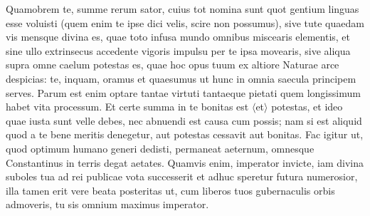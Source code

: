 Quamobrem te, summe rerum sator, cuius tot nomina sunt quot gentium linguas esse voluisti (quem enim te ipse dici velis, scire non possumus), sive tute quaedam vis mensque divina es, quae toto infusa mundo omnibus miscearis elementis, et sine ullo extrinsecus accedente vigoris impulsu per te ipsa movearis, sive aliqua supra omne caelum potestas es, quae hoc opus tuum ex altiore Naturae arce despicias: te, inquam, oramus et quaesumus ut hunc in omnia saecula principem serves. Parum est enim optare tantae virtuti tantaeque pietati quem longissimum habet vita processum. Et certe summa in te bonitas est $\langle$et$\rangle$ potestas, et ideo quae iusta sunt velle debes, nec abnuendi est causa cum possis; nam si est aliquid quod a te bene meritis denegetur, aut potestas cessavit aut bonitas. Fac igitur ut, quod optimum humano generi dedisti, permaneat aeternum, omnesque Constantinus in terris degat aetates. Quamvis enim, imperator invicte, iam divina suboles tua ad rei publicae vota successerit et adhuc speretur futura numerosior, illa tamen erit vere beata posteritas ut, cum liberos tuos gubernaculis orbis admoveris, tu sis omnium maximus imperator.
